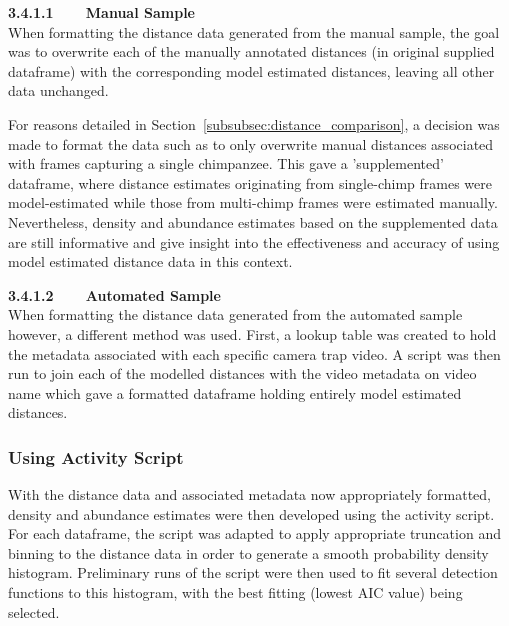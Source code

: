 \vspace{3mm}

\textbf{3.4.1.1~~~~Manual Sample}\vspace{4.5mm}\\
When formatting the distance data generated from the manual sample, the goal was to
overwrite each of the manually annotated distances (in original supplied dataframe)
with the corresponding model estimated distances, leaving all other data unchanged.

For reasons detailed in Section~\ref{subsubsec:distance_comparison}, a decision was
made to format the data such as to only overwrite manual distances associated with
frames capturing a single chimpanzee.
This gave a 'supplemented' dataframe, where distance estimates originating from
single-chimp frames were model-estimated while those from multi-chimp frames were
estimated manually.
Nevertheless, density and abundance estimates based on the supplemented data are still
informative and give insight into the effectiveness and accuracy of using model estimated
distance data in this context.

\vspace{3mm}

\textbf{3.4.1.2~~~~Automated Sample}\vspace{4.5mm}\\
When formatting the distance data generated from the automated sample however, a
different method was used.
First, a lookup table was created to hold the metadata associated with each specific
camera trap video.
A script was then run to join each of the modelled distances with the video metadata
on video name which gave a formatted dataframe holding entirely model estimated distances.

\subsubsection{Using Activity Script}

With the distance data and associated metadata now appropriately formatted, density
and abundance estimates were then developed using the activity script.
For each dataframe, the script was adapted to apply appropriate truncation and binning
to the distance data in order to generate a smooth probability density histogram.
Preliminary runs of the script were then used to fit several detection functions to
this histogram, with the best fitting (lowest AIC value) being selected.